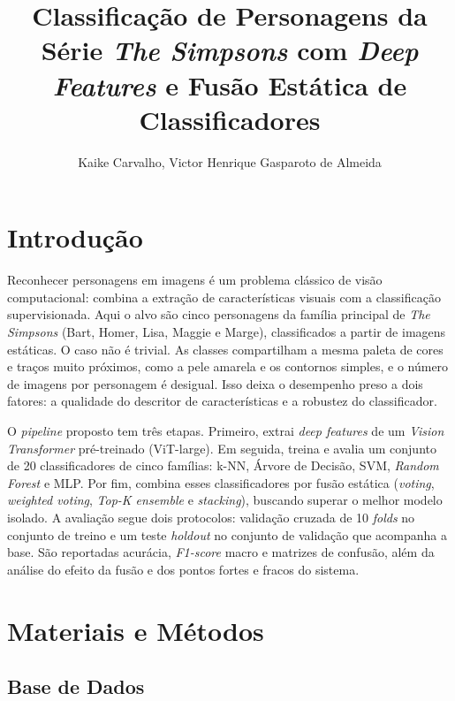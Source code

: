 \documentclass[12pt]{article}
\title{Classificação de Personagens da Série \textit{The Simpsons} com
\textit{Deep Features} e Fusão Estática de Classificadores}
\author{Kaike Carvalho\inst{1}, Victor Henrique Gasparoto de Almeida\inst{1}}
\begin{document}
\maketitle

\section{Introdução}

Reconhecer personagens em imagens é um problema clássico de visão
computacional: combina a extração de características visuais com a classificação
supervisionada. Aqui o alvo são cinco personagens da família principal de
\textit{The Simpsons} (Bart, Homer, Lisa, Maggie e Marge), classificados a partir
de imagens estáticas. O caso não é trivial. As classes compartilham a mesma
paleta de cores e traços muito próximos, como a pele amarela e os contornos
simples, e o número de imagens por personagem é desigual. Isso deixa o
desempenho preso a dois fatores: a qualidade do descritor de características e a
robustez do classificador.

O \textit{pipeline} proposto tem três etapas. Primeiro, extrai
\textit{deep features} de um \textit{Vision Transformer} pré-treinado
(ViT-large). Em seguida, treina e avalia um conjunto de 20 classificadores de
cinco famílias: k-NN, Árvore de Decisão, SVM, \textit{Random Forest} e MLP. Por
fim, combina esses classificadores por fusão estática (\textit{voting},
\textit{weighted voting}, \textit{Top-K ensemble} e \textit{stacking}), buscando
superar o melhor modelo isolado. A avaliação segue dois protocolos: validação
cruzada de 10 \textit{folds} no conjunto de treino e um teste \textit{holdout}
no conjunto de validação que acompanha a base. São reportadas acurácia,
\textit{F1-score} macro e matrizes de confusão, além da análise do efeito da
fusão e dos pontos fortes e fracos do sistema.

\section{Materiais e Métodos}

\subsection{Base de Dados}
\end{document}
